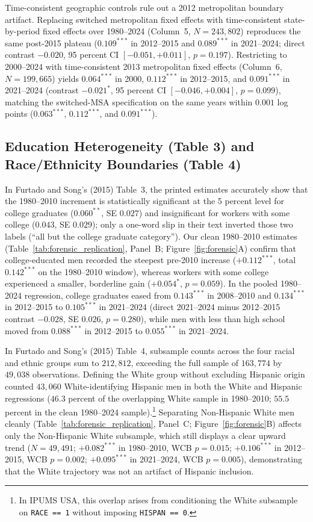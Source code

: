 \documentclass[11pt]{article}
\begin{document}
Time-consistent geographic controls rule out a 2012 metropolitan boundary artifact. Replacing switched metropolitan fixed effects with time-consistent state-by-period fixed effects over 1980--2024 (Column~5, $N = 243{,}802$) reproduces the same post-2015 plateau ($0.109^{***}$ in 2012--2015 and $0.089^{***}$ in 2021--2024; direct contrast $-0.020$, 95 percent CI $[-0.051, +0.011]$, $p = 0.197$). Restricting to 2000--2024 with time-consistent 2013 metropolitan fixed effects (Column~6, $N = 199{,}665$) yields $0.064^{***}$ in 2000, $0.112^{***}$ in 2012--2015, and $0.091^{***}$ in 2021--2024 (contrast $-0.021^{*}$, 95 percent CI $[-0.046, +0.004]$, $p = 0.099$), matching the switched-MSA specification on the same years within $0.001$ log points ($0.063^{***}$, $0.112^{***}$, and $0.091^{***}$).

\subsection{Education Heterogeneity (Table 3) and Race/Ethnicity Boundaries (Table 4)}
In Furtado and Song's (2015) Table~3, the printed estimates accurately show that the 1980--2010 increment is statistically significant at the 5 percent level for college graduates ($0.060^{**}$, SE $0.027$) and insignificant for workers with some college ($0.043$, SE $0.029$); only a one-word slip in their text inverted those two labels (``all but the college graduate category''). Our clean 1980--2010 estimates (Table~\ref{tab:forensic_replication}, Panel~B; Figure~\ref{fig:forensic}A) confirm that college-educated men recorded the steepest pre-2010 increase ($+0.112^{***}$, total $0.142^{***}$ on the 1980--2010 window), whereas workers with some college experienced a smaller, borderline gain ($+0.054^{*}$, $p = 0.059$). In the pooled 1980--2024 regression, college graduates eased from $0.143^{***}$ in 2008--2010 and $0.134^{***}$ in 2012--2015 to $0.105^{***}$ in 2021--2024 (direct 2021--2024 minus 2012--2015 contrast $-0.028$, SE $0.026$, $p = 0.280$), while men with less than high school moved from $0.088^{***}$ in 2012--2015 to $0.055^{***}$ in 2021--2024.

In Furtado and Song's (2015) Table~4, subsample counts across the four racial and ethnic groups sum to $212{,}812$, exceeding the full sample of $163{,}774$ by $49{,}038$ observations. Defining the White group without excluding Hispanic origin counted $43{,}060$ White-identifying Hispanic men in both the White and Hispanic regressions ($46.3$ percent of the overlapping White sample in 1980--2010; $55.5$ percent in the clean 1980--2024 sample).\footnote{In IPUMS USA, this overlap arises from conditioning the White subsample on \texttt{RACE == 1} without imposing \texttt{HISPAN == 0}.} Separating Non-Hispanic White men cleanly (Table~\ref{tab:forensic_replication}, Panel~C; Figure~\ref{fig:forensic}B) affects only the Non-Hispanic White subsample, which still displays a clear upward trend ($N = 49{,}491$; $+0.082^{***}$ in 1980--2010, WCB $p = 0.015$; $+0.106^{***}$ in 2012--2015, WCB $p = 0.002$; $+0.095^{***}$ in 2021--2024, WCB $p = 0.005$), demonstrating that the White trajectory was not an artifact of Hispanic inclusion.
\end{document}
